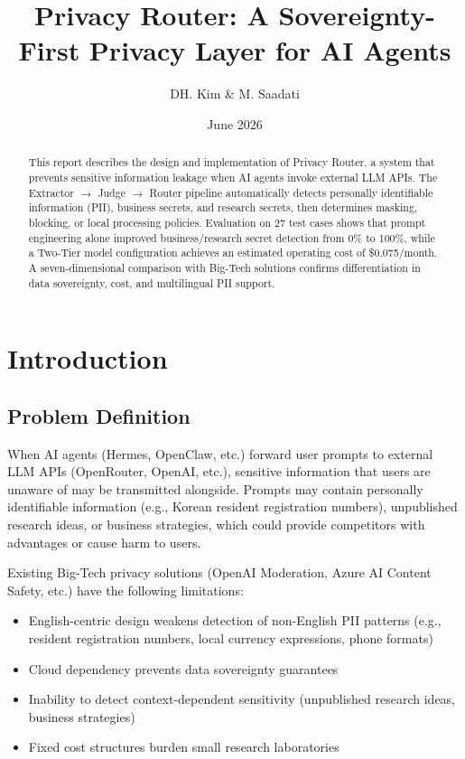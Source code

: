 \documentclass[11pt,a4paper]{article}
\title{Privacy Router: A Sovereignty-First Privacy Layer for AI Agents}
\author{DH. Kim \& M. Saadati}
\date{June 2026}
\begin{document}
\maketitle

\begin{abstract}
This report describes the design and implementation of Privacy Router, a system that prevents sensitive information leakage when AI agents invoke external LLM APIs. The Extractor $\rightarrow$ Judge $\rightarrow$ Router pipeline automatically detects personally identifiable information (PII), business secrets, and research secrets, then determines masking, blocking, or local processing policies. Evaluation on 27 test cases shows that prompt engineering alone improved business/research secret detection from 0\% to 100\%, while a Two-Tier model configuration achieves an estimated operating cost of \$0.075/month. A seven-dimensional comparison with Big-Tech solutions confirms differentiation in data sovereignty, cost, and multilingual PII support.
\end{abstract}

\tableofcontents
\newpage

\section{Introduction}

\subsection{Problem Definition}

When AI agents (Hermes, OpenClaw, etc.) forward user prompts to external LLM APIs (OpenRouter, OpenAI, etc.), sensitive information that users are unaware of may be transmitted alongside. Prompts may contain personally identifiable information (e.g., Korean resident registration numbers), unpublished research ideas, or business strategies, which could provide competitors with advantages or cause harm to users.

Existing Big-Tech privacy solutions (OpenAI Moderation, Azure AI Content Safety, etc.) have the following limitations:

\begin{itemize}[nosep]
  \item English-centric design weakens detection of non-English PII patterns (e.g., resident registration numbers, local currency expressions, phone formats)
  \item Cloud dependency prevents data sovereignty guarantees
  \item Inability to detect context-dependent sensitivity (unpublished research ideas, business strategies)
  \item Fixed cost structures burden small research laboratories
\end{itemize}
\end{document}
